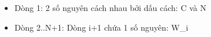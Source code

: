 \begin{itemize}
	\item     Dòng 1: 2 số nguyên cách nhau bởi dấu cách: C và N   
	\item     Dòng 2..N+1: Dòng i+1 chứa 1 số nguyên: W\_i   
\end{itemize}